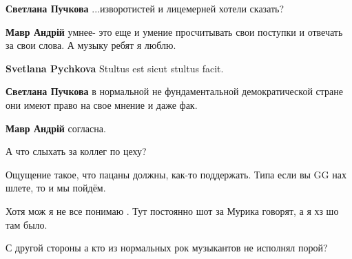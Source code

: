 \begin{itemize}
\begin{itemize}
\textbf{Светлана Пучкова} ...изворотистей и лицемерней хотели сказать?

 
\textbf{Мавр Андрій} умнее- это еще и умение просчитывать свои поступки и отвечать за свои слова. А музыку ребят я люблю.

 
\textbf{Svetlana Pychkova} Stultus est sicut stultus facit.

 
\textbf{Светлана Пучкова} в нормальной не фундаментальной демократической стране они имеют право на свое мнение и даже фак.

 
\textbf{Мавр Андрій} согласна.
\end{itemize}

 

А что слыхать за коллег по цеху?

Ощущение такое, что пацаны должны, как-то поддержать. Типа если вы GG нах
шлете, то и мы пойдём.

Хотя мож я не все понимаю . Тут постоянно шот за Мурика говорят, а я хз шо там
было.

С другой стороны а кто из нормальных рок музыкантов не исполнял порой?



\end{itemize}
